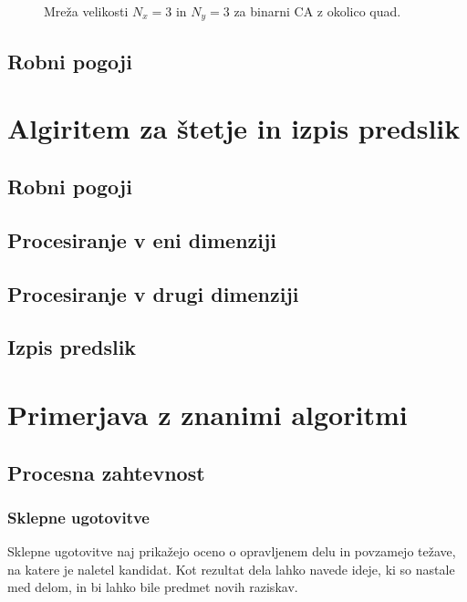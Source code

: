 \documentclass[12pt,a4paper,openany]{book}
\begin{document}
\begin{figure}[htb]
\centerline{}
\caption[Mreža polja celic.]{Mreža velikosti \(N_x=3\) in \(N_y=3\) za binarni CA z okolico quad.}
\label{network_array}
\end{figure}

\section{Robni pogoji} 


\chapter{Algiritem za štetje in izpis predslik}

\section{Robni pogoji}

\section{Procesiranje v eni dimenziji}

\section{Procesiranje v drugi dimenziji}

\section{Izpis predslik}


\chapter{Primerjava z znanimi algoritmi}

\section{Procesna zahtevnost}


\subsection{Sklepne ugotovitve}

Sklepne ugotovitve naj prikažejo oceno o opravljenem delu in povzamejo težave, na katere je naletel kandidat. Kot rezultat dela
lahko navede ideje, ki so nastale med delom, in bi lahko bile predmet novih raziskav.
\end{document}
